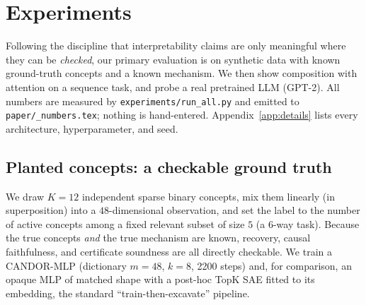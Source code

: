 \documentclass[11pt]{article}
\providecommand{\nIn}{48}\providecommand{\nConcepts}{12}\providecommand{\nRelevant}{5}
\providecommand{\nClasses}{6}\providecommand{\dictM}{48}\providecommand{\topK}{8}
\providecommand{\plantedSteps}{2200}
\begin{document}
\section{Experiments}
\label{sec:exp}
Following the discipline that interpretability claims are only meaningful where they can
be \emph{checked}, our primary evaluation is on synthetic data with known ground-truth
concepts and a known mechanism. We then show composition with attention on a sequence
task, and probe a real pretrained LLM (GPT-2). All numbers are measured by
\texttt{experiments/run\_all.py} and emitted to
\texttt{paper/\_numbers.tex}; nothing is hand-entered. Appendix~\ref{app:details}
lists every architecture, hyperparameter, and seed.

\subsection{Planted concepts: a checkable ground truth}
\label{sec:planted}
We draw $K=\nConcepts$ independent sparse binary concepts, mix them linearly (in
superposition) into a $\nIn$-dimensional observation, and set the label to the number of
active concepts among a fixed relevant subset of size $\nRelevant$ (a
$\nClasses$-way task). Because the true concepts \emph{and} the true mechanism are
known, recovery, causal faithfulness, and certificate soundness are all directly
checkable. We train a CANDOR-MLP (dictionary $m=\dictM$, $k=\topK$, \plantedSteps{}
steps) and, for comparison, an opaque MLP of matched shape with a post-hoc TopK SAE
fitted to its embedding, the standard ``train-then-excavate'' pipeline.
\end{document}
